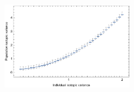 \documentclass{frontiersSCNS}
\begin{document}
\begin{figure}[h!]
\centering
\includegraphics[width=0.5\textwidth]{fig_indpopvar.pdf}
\caption{
}
  \label{figindpopvar}
\end{figure}
\end{document}
